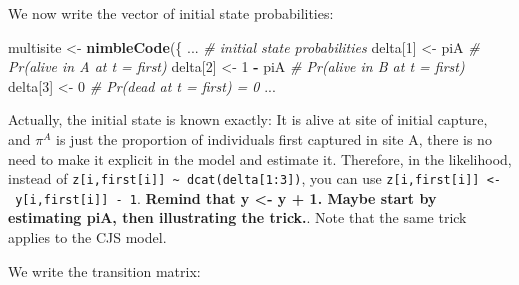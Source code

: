 \documentclass[
  12pt,
]{krantz}
\newenvironment{Shaded}{\begin{snugshade}}{\end{snugshade}}
\newcommand{\CommentTok}[1]{\textcolor[rgb]{0.56,0.35,0.01}{\textit{#1}}}
\newcommand{\DecValTok}[1]{\textcolor[rgb]{0.00,0.00,0.81}{#1}}
\newcommand{\FunctionTok}[1]{\textcolor[rgb]{0.13,0.29,0.53}{\textbf{#1}}}
\newcommand{\NormalTok}[1]{#1}
\newcommand{\OtherTok}[1]{\textcolor[rgb]{0.56,0.35,0.01}{#1}}
\newcommand{\SpecialCharTok}[1]{\textcolor[rgb]{0.81,0.36,0.00}{\textbf{#1}}}
\begin{document}
We now write the vector of initial state probabilities:

\begin{Shaded}
\begin{Highlighting}[]
\NormalTok{multisite }\OtherTok{\textless{}{-}} \FunctionTok{nimbleCode}\NormalTok{(\{}
\NormalTok{...}
  \CommentTok{\# initial state probabilities}
\NormalTok{  delta[}\DecValTok{1}\NormalTok{] }\OtherTok{\textless{}{-}}\NormalTok{ piA          }\CommentTok{\# Pr(alive in A at t = first)}
\NormalTok{  delta[}\DecValTok{2}\NormalTok{] }\OtherTok{\textless{}{-}} \DecValTok{1} \SpecialCharTok{{-}}\NormalTok{ piA      }\CommentTok{\# Pr(alive in B at t = first)}
\NormalTok{  delta[}\DecValTok{3}\NormalTok{] }\OtherTok{\textless{}{-}} \DecValTok{0}            \CommentTok{\# Pr(dead at t = first) = 0}
\NormalTok{...}
\end{Highlighting}
\end{Shaded}

Actually, the initial state is known exactly: It is alive at site of initial capture, and \(\pi^A\) is just the proportion of individuals first captured in site A, there is no need to make it explicit in the model and estimate it. Therefore, in the likelihood, instead of \texttt{z{[}i,first{[}i{]}{]}\ \textasciitilde{}\ dcat(delta{[}1:3{]})}, you can use \texttt{z{[}i,first{[}i{]}{]}\ \textless{}-\ y{[}i,first{[}i{]}{]}\ -\ 1}. \textbf{Remind that y \textless- y + 1. Maybe start by estimating piA, then illustrating the trick.}. Note that the same trick applies to the CJS model.

We write the transition matrix:
\end{document}
